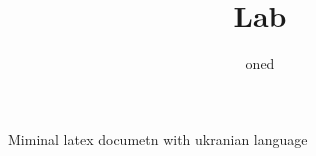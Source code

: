 \documentclass[12pt]{article}
\author{oned}
\title{Lab}
\date{}
\begin{document}
\maketitle
Miminal latex documetn with ukranian language
\end{document}
